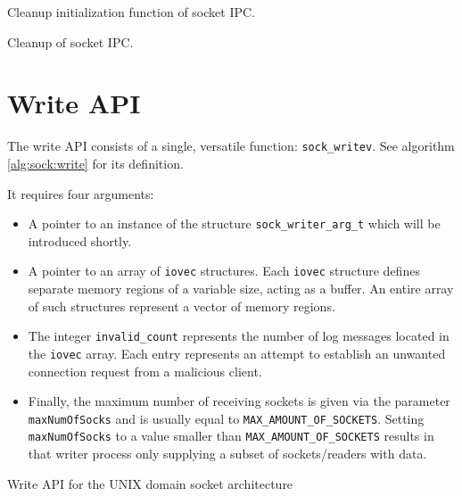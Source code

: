 \begin{algorithm}[h!]
    
    \caption[Socket: Socket finalization]{Cleanup initialization function of socket \ac{IPC}.}
    \label{alg:sock:finalize}
\end{algorithm}

\begin{algorithm}[h!]
    
    \caption[Socket: Socket cleanup]{Cleanup of socket \ac{IPC}.}
    \label{alg:sock:cleanup}
\end{algorithm}

\section{Write \ac{API}}
\label{cha:WriteAPI}
The write \ac{API} consists of a single, versatile function\@: \texttt{sock\_writev}.
See algorithm \ref{alg:sock:write} for its definition.

It requires four arguments:
\begin{itemize}
    \item A pointer to an instance of the structure \texttt{sock\_writer\_arg\_t} which will be introduced shortly.
    \item A pointer to an array of \texttt{iovec} structures.
            Each \texttt{iovec} structure defines separate memory regions of a variable size, acting as a buffer.
            An entire array of such structures represent a vector of memory regions\cite{man:iovec}.
    \item The integer \texttt{invalid\_count} represents the number of log messages located in the \texttt{iovec} array.
            Each entry represents an attempt to establish an unwanted connection request from a malicious client.  
    \item Finally, the maximum number of receiving sockets is given via the parameter \texttt{maxNumOfSocks} and is usually equal to \texttt{MAX\_AMOUNT\_OF\_SOCKETS}.
            Setting \texttt{maxNumOfSocks} to a value smaller than \texttt{MAX\_AMOUNT\_OF\_SOCKETS} results in that writer process only supplying a subset of sockets/readers with data.
\end{itemize}

\begin{algorithm}[h!]
    
    \caption[Socket: Write \ac{API}]{Write \ac{API} for the UNIX domain socket architecture}
    \label{alg:sock:write}
\end{algorithm}

